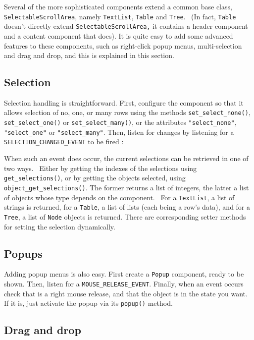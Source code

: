 Several of the more sophisticated components extend a common base class,
\texttt{SelectableScrollArea}, namely \texttt{TextList}, \texttt{Table}
and \texttt{Tree}. \ (In fact, \texttt{Table} doesn't
directly extend \texttt{SelectableScrollArea,} it contains a header
component and a content component that does). It is quite easy to add
some advanced features to these components, such as right-click popup
menus, multi-selection and drag and drop, and this is explained in this
section.

\subsection{Selection}

Selection handling is straightforward. First, configure the component
so that it allows selection of no, one, or many rows using the methods
\texttt{set\_select\_none()}, \texttt{set\_select\_one()} or
\texttt{set\_select\_many()}, or the attributes
\texttt{"select\_none"}, \texttt{"select\_one"} or \texttt{"select\_many"}.
Then, listen for changes by listening for a
\texttt{SELECTION\_CHANGED\_EVENT} to be fired :


When such an event does occur, the current selections can be retrieved
in one of two ways. \ Either by getting the indexes of the selections
using \texttt{get\_selections()}, or by getting the objects selected,
using \texttt{object\_get\_selections()}. The former returns a list
of integers, the latter a list of objects whose type depends on the
component. \ For a \texttt{TextList}, a list of strings is returned,
for a \texttt{Table}, a list of lists (each being a
row's data), and for a \texttt{Tree}, a list of
\texttt{Node} objects is returned.
There are corresponding setter methods for setting the selection dynamically.


\subsection{Popups}

Adding popup menus is also easy. First create a \texttt{Popup}
component, ready to be shown. Then, listen for a
\texttt{MOUSE\_RELEASE\_EVENT}. Finally, when an event occurs check
that is a right mouse release, and that the object is in the state you
want. If it is, just activate the popup via its \texttt{popup()}
method.

\subsection{Drag and drop}

